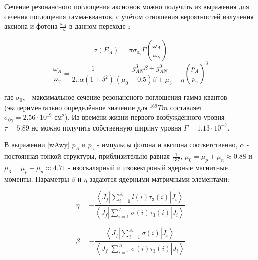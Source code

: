 \documentclass[a4paper,article,14pt]{extarticle}
\begin{document}
Сечение резонансного поглощения аксионов можно получить из выражения для сечения поглощения гамма-квантов, с учётом отношения вероятностей излучения аксиона и фотона $\frac{\omega_A}{\omega _{\gamma}}$ в данном переходе \cite{donnelly1978axions}:

\begin{equation} \label{sech}
    \sigma \left( {{E_A}} \right) =  \pi  {\sigma _{{0_\gamma }}} \Gamma \left( {\frac{{{\omega _A}}}{{{\omega _\gamma }}}} \right)
\end{equation}
\begin{equation} \label{wAwy}
    \frac{{{\omega _A}}}{{{\omega _\gamma }}} = \frac{1}{{2\pi \alpha \left( {1 + {\delta ^2}} \right)}}\frac{{g_{AN}^3 \beta + g_{AN}^0}}{{\left( {\mu_0  - 0.5} \right)\beta  + {\mu_3} - \eta }} \left( {\frac{{{p_A}}}{{{p _\gamma }}}} \right)^3
\end{equation}

где  $\sigma_{0\gamma}$ - максимальное сечение резонансного поглощения гамма-квантов (экспериментально определённое значение для $^{169}Tm$ составляет $\sigma_{0\gamma} = 2.56 \cdot 10^{19} \text{ см}^2$). Из времени жизни первого возбуждённого уровня $\tau = 5.89 \text{ нс}$ можно получить собственную ширину уровня $\Gamma = 1.13 \cdot 10^{-7}$. 

В выражении \eqref{wAwy} $p_A$ и $p_{\gamma}$ - импульсы фотона и аксиона соответственно, $\alpha$ - постоянная тонкой структуры, приблизительно равная $\frac{1}{137}$, $\mu_0 = \mu_p + \mu_n \approx 0.88$ и $\mu_3 = \mu_p - \mu_n \approx 4.71$ - изоскалярный и изовектроный ядерные магнитные моменты. Параметры $\beta$ и $\eta$ задаются ядерными матричными элементами:

\begin{equation}
    \eta  =  - \frac{{\left\langle {{J_f}\left| {\sum\limits_{i = 1}^A {l\left( i \right){\tau _3}\left( i \right)} } \right|{J_i}} \right\rangle }}{{\left\langle {{J_f}\left| {\sum\limits_{i = 1}^A {\sigma \left( i \right){\tau _3}\left( i \right)} } \right|{J_i}} \right\rangle }}
\end{equation}

\begin{equation}
    \beta  =  - \frac{{\left\langle {{J_f}\left| {\sum\limits_{i = 1}^A {\sigma \left( i \right)} } \right|{J_i}} \right\rangle }}{{\left\langle {{J_f}\left| {\sum\limits_{i = 1}^A {\sigma \left( i \right){\tau _3}\left( i \right)} } \right|{J_i}} \right\rangle }}
\end{equation}
\end{document}
